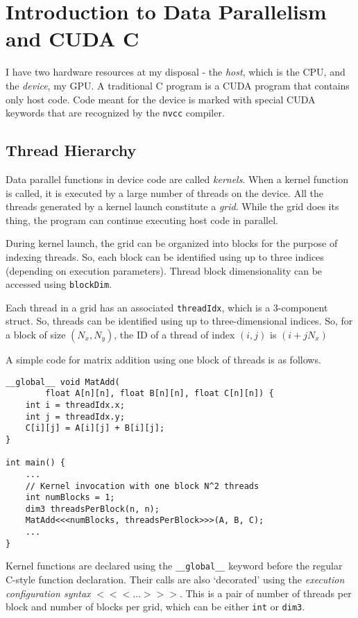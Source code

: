 \section{Introduction to Data Parallelism and CUDA C}
I have two hardware resources at my disposal - the \textit{host},
which is the CPU, and the \textit{device}, my GPU. A traditional
C program is a CUDA program that contains only host code. Code
meant for the device is marked with special CUDA keywords that
are recognized by the \texttt{nvcc} compiler.

\subsection*{Thread Hierarchy}
Data parallel functions in device code are called \textit{kernels}.
When a kernel function is called, it is executed by a large number
of threads on the device. All the threads generated by a kernel
launch constitute a \textit{grid}. While the grid does its thing,
the program can continue executing host code in parallel.

During kernel launch, the grid can be organized into blocks
for the purpose of indexing threads. So, each block can be identified
using up to three indices (depending on execution parameters).
Thread block dimensionality can be accessed using
\texttt{blockDim}.

Each thread in a grid has an associated \texttt{threadIdx}, which
is a 3-component struct. So, threads can be identified using up to
three-dimensional indices. So, for a block of size $(N_{x}, N_{y})$,
the ID of a thread of index $(i,j) $ is $(i + jN_x)$

A simple code for matrix addition using one block of threads is
as follows.

\begin{verbatim}
__global__ void MatAdd(
        float A[n][n], float B[n][n], float C[n][n]) {
    int i = threadIdx.x;
    int j = threadIdx.y;
    C[i][j] = A[i][j] + B[i][j];
}

int main() {
    ...
    // Kernel invocation with one block N^2 threads
    int numBlocks = 1;
    dim3 threadsPerBlock(n, n);
    MatAdd<<<numBlocks, threadsPerBlock>>>(A, B, C);
    ...
}
\end{verbatim}

Kernel functions are declared using the \texttt{\_\_global\_\_}
keyword before the regular C-style function declaration. Their
calls are also `decorated' using the \textit{execution
configuration syntax} \texttt{$<<< \ldots >>>$}. This is a pair
of number of threads per block and number of blocks per grid, which
can be either \texttt{int} or \texttt{dim3}.


